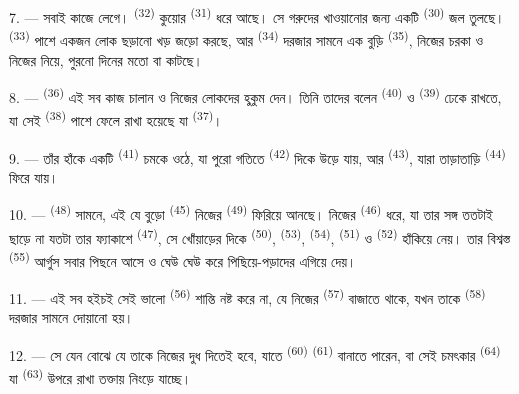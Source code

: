 7. --- সবাই কাজে লেগে।  \textsuperscript{(32)} কুয়োর
 \textsuperscript{(31)} ধরে আছে। সে গরুদের খাওয়ানোর জন্য একটি
 \textsuperscript{(30)} জল তুলছে। 
\textsuperscript{(33)} পাশে একজন লোক ছড়ানো খড় জড়ো করছে, আর 
\textsuperscript{(34)} দরজার সামনে এক বুড়ি 
\textsuperscript{(35)}, নিজের চরকা ও নিজের  নিয়ে, পুরনো দিনের মতো
 বা  কাটছে।

\VUsaut{3.0mm}
\VUsaut{3.0mm}

8. ---  \textsuperscript{(36)} এই সব কাজ চালান ও নিজের
লোকদের হুকুম দেন। তিনি তাদের বলেন  \textsuperscript{(40)} ও
 \textsuperscript{(39)} ঢেকে রাখতে, যা সেই 
\textsuperscript{(38)} পাশে ফেলে রাখা হয়েছে যা 
\textsuperscript{(37)}।

9. --- তাঁর হাঁকে একটি  \textsuperscript{(41)} চমকে ওঠে, যা পুরো
গতিতে  \textsuperscript{(42)} দিকে উড়ে যায়, আর
 \textsuperscript{(43)}, যারা তাড়াতাড়ি 
\textsuperscript{(44)} ফিরে যায়।

10. ---  \textsuperscript{(48)} সামনে, এই যে বুড়ো
 \textsuperscript{(45)} নিজের  \textsuperscript{(49)}
ফিরিয়ে আনছে। নিজের  \textsuperscript{(46)} ধরে, যা তার সঙ্গ ততটাই
ছাড়ে না যতটা তার ফ্যাকাশে  \textsuperscript{(47)}, সে খোঁয়াড়ের
দিকে  \textsuperscript{(50)},  \textsuperscript{(53)},
 \textsuperscript{(54)},  \textsuperscript{(51)} ও
 \textsuperscript{(52)} হাঁকিয়ে নেয়। তার বিশ্বস্ত
 \textsuperscript{(55)} আর্গুস সবার পিছনে আসে ও ঘেউ ঘেউ করে
পিছিয়ে-পড়াদের এগিয়ে দেয়।

11. --- এই সব হইচই সেই ভালো  \textsuperscript{(56)} শান্তি
নষ্ট করে না, যে নিজের  \textsuperscript{(57)} বাজাতে থাকে, যখন তাকে
 \textsuperscript{(58)} দরজার সামনে দোয়ানো হয়।

12. --- সে যেন বোঝে যে তাকে নিজের দুধ দিতেই হবে, যাতে 
\textsuperscript{(60)}  \textsuperscript{(61)} 
বানাতে পারেন, বা সেই চমৎকার  \textsuperscript{(64)} যা
 \textsuperscript{(63)} উপরে রাখা তক্তায় নিংড়ে যাচ্ছে।

